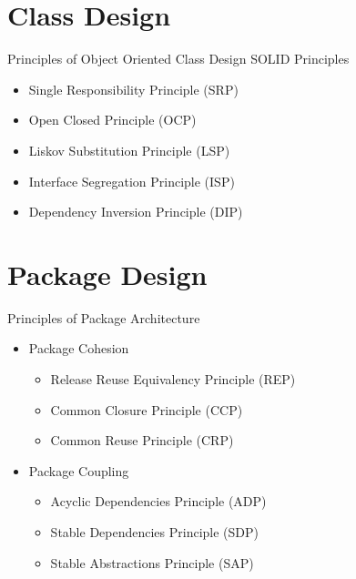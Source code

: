 \documentclass[xcolor=svgnames]{beamer}
\begin{document}

\section{Class Design}


\begin{frame}{Principles of Object Oriented Class Design}
    SOLID Principles
    \begin{itemize}
        \item Single Responsibility Principle (SRP)
        \item Open Closed Principle (OCP)
        \item Liskov Substitution Principle (LSP)
        \item Interface Segregation Principle (ISP)
        \item Dependency Inversion Principle (DIP)
    \end{itemize}
\end{frame}


\section{Package Design}


\begin{frame}{Principles of Package Architecture}
    \begin{itemize}
        \item<1-> Package Cohesion
            \begin{itemize}
                \item<3-> Release Reuse Equivalency Principle (REP)
                \item<4-> Common Closure Principle (CCP)
                \item<5-> Common Reuse Principle (CRP)
            \end{itemize}
        \item<2-> Package Coupling
            \begin{itemize}
                \item<6-> Acyclic Dependencies Principle (ADP)
                \item<7-> Stable Dependencies Principle (SDP)
                \item<8-> Stable Abstractions Principle (SAP)
            \end{itemize}
    \end{itemize}
\end{frame}
\end{document}
